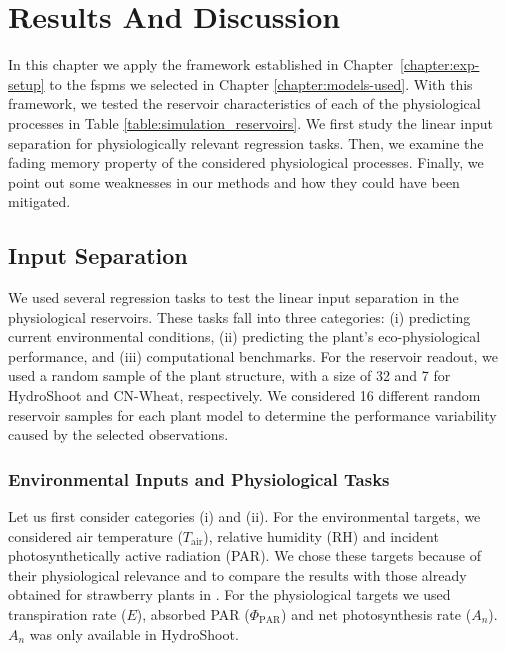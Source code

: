 \chapter{Results And Discussion} \label{chapter:results}

In this chapter we apply the framework established in \mbox{Chapter \ref{chapter:exp-setup}} to the \acrshort{fspm}s we selected in Chapter \ref{chapter:models-used}.
With this framework, we tested the reservoir characteristics of each of the physiological processes in Table \ref{table:simulation_reservoirs}.
We first study the linear input separation for physiologically relevant regression tasks.
Then, we examine the fading memory property of the considered physiological processes. 
Finally, we point out some weaknesses in our methods and how they could have been mitigated.


\section{Input Separation} \label{results:input-sep}

We used several regression tasks to test the linear input separation in the physiological reservoirs.
These tasks fall into three categories: (i) predicting current environmental conditions, (ii) predicting the plant's eco-physiological performance, and (iii) computational benchmarks.
For the reservoir readout, we used a random sample of the plant structure, with a size of 32 and 7 for HydroShoot and CN-Wheat, respectively.
We considered 16 different random reservoir samples for each plant model to determine the performance variability caused by the selected observations.


\subsection{Environmental Inputs and Physiological Tasks}

Let us first consider categories (i) and (ii).
For the environmental targets, we considered air temperature ($T_{\text{air}}$), relative humidity (RH) and incident photosynthetically active radiation (PAR).
We chose these targets because of their physiological relevance and to compare the results with those already obtained for strawberry plants in \citet{pieters_reservoir_2022}.
For the physiological targets we used transpiration rate ($E$), absorbed PAR ($\Phi_{\text{PAR}}$) and net photosynthesis rate ($A_n$). 
$A_n$ was only available in HydroShoot.


